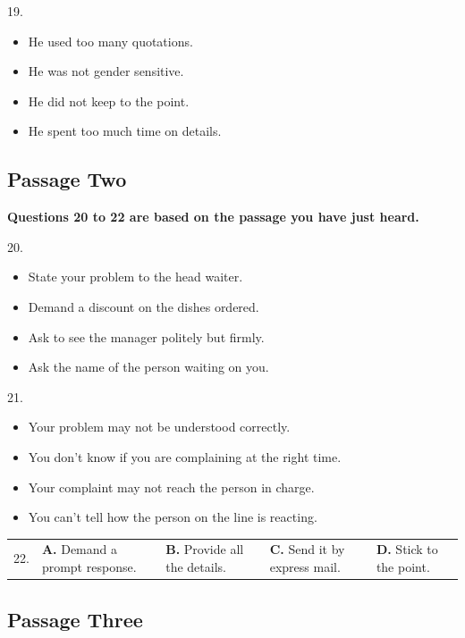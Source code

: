 \documentclass[UTF8,11pt]{ctexart}
\begin{document}
19.


\begin{itemize}[leftmargin=2em,itemsep=.2em,topsep=.4em]\item[A.] He used too many quotations.
\item[B.] He was not gender sensitive.
\item[C.] He did not keep to the point.
\item[D.] He spent too much time on details.
\end{itemize}

\subsection*{\textbf{Passage Two}}


\textbf{Questions 20 to 22 are based on the passage you have just heard.}


20.


\begin{itemize}[leftmargin=2em,itemsep=.2em,topsep=.4em]\item[A.] State your problem to the head waiter.
\item[B.] Demand a discount on the dishes ordered.
\item[C.] Ask to see the manager politely but firmly.
\item[D.] Ask the name of the person waiting on you.
\end{itemize}

21.


\begin{itemize}[leftmargin=2em,itemsep=.2em,topsep=.4em]\item[A.] Your problem may not be understood correctly.
\item[B.] You don’t know if you are complaining at the right time.
\item[C.] Your complaint may not reach the person in charge.
\item[D.] You can’t tell how the person on the line is reacting.
\end{itemize}

\noindent\begin{tabularx}{\linewidth}{@{}lXXXX@{}}22. & \textbf{A.} Demand a prompt response. & \textbf{B.} Provide all the details. & \textbf{C.} Send it by express mail. & \textbf{D.} Stick to the point.\\\end{tabularx}\par

\subsection*{\textbf{Passage Three}}
\end{document}
